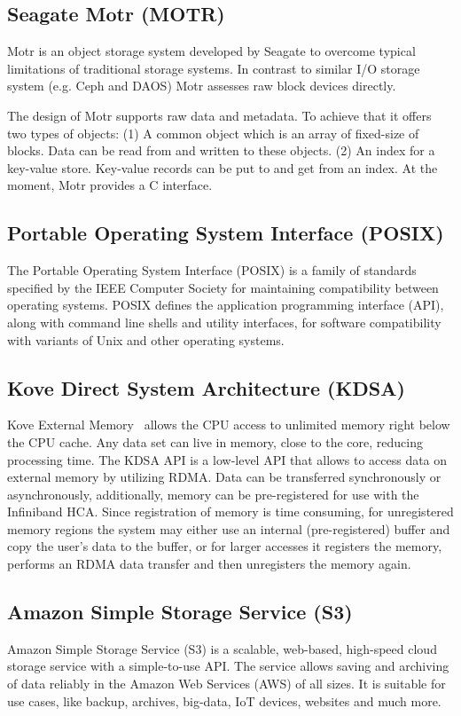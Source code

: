 \subsection{Seagate Motr (MOTR)}
Motr is an object storage system developed by Seagate to overcome typical limitations of traditional storage systems.
In contrast to similar I/O storage system (e.g. Ceph and DAOS) Motr assesses raw block devices directly.

The design of Motr supports raw data and metadata.
To achieve that it offers two types of objects:
(1) A common object which is an array of fixed-size of blocks. 
Data can be read from and written to these objects. 
(2) An index for a key-value store. 
Key-value records can be put to and get from an index. 
At the moment, Motr provides a C interface.

\subsection{Portable Operating System Interface (POSIX)}
The Portable Operating System Interface (POSIX) is a family of standards specified by the IEEE Computer Society for maintaining compatibility between operating systems.
POSIX defines the application programming interface (API), along with command line shells and utility interfaces, for software compatibility with variants of Unix and other operating systems.

\subsection{Kove Direct System Architecture (KDSA)}
Kove External Memory~\cite{10.1007/978-3-319-67630-2_48} allows the CPU access to unlimited memory right below the CPU cache. 
Any data set can live in memory, close to the core, reducing processing time.
The KDSA API is a low-level API that allows to access data on external memory by utilizing RDMA. 
Data can be transferred synchronously or asynchronously, additionally, memory can be pre-registered for use with the Infiniband HCA. 
Since registration of memory is time consuming, for unregistered memory regions the system may either use an internal (pre-registered) buffer and copy the user’s data to the buffer, or for larger accesses it registers the memory, performs an RDMA data transfer and then unregisters the memory again.

\subsection{Amazon Simple Storage Service (S3)} 
Amazon Simple Storage Service (S3) is a scalable, web-based, high-speed cloud storage service with a simple-to-use API.
The service allows saving and archiving of data reliably in the Amazon Web Services (AWS) of all sizes.
It is suitable for use cases, like backup, archives, big-data, IoT devices, websites and much more.
